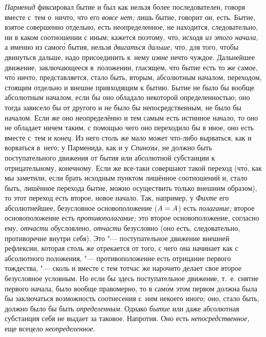 {\em Парменид} фиксировал бытие и был как нельзя более последователен, говоря
вместе с~тем о~ничто, что его {\em вовсе нет;} лишь бытие, говорит он, есть.
Бытие, взятое совершенно отдельно, есть неопределенное, не находится,
следовательно, ни в каком соотношении с иным; кажется поэтому, что, исходя
{\em из этого начала,} а именно из самог\'{о} бытия,
нельзя {\em двигаться дальше,} что, для того,
чтобы двинуться дальше, надо присоединить к~нему {\em извне} нечто чуждое.
Дальнейшее движение, заключающееся в~положении, гласящем, что бытие есть то же
самое, чт\'{о} ничто, представляется, стало быть, вторым, абсолютным началом,
переходом, стоящим отдельно и внешне привходящим к бытию. Бытие не было бы
вообще абсолютным началом, если бы оно обладало некоторой определенностью; оно
тогда зависело бы от другого и не было бы непосредственным, не было бы началом.
Если же оно неопределённо и тем самым есть истинное начало, то оно не обладает
ничем таким, с помощью чего оно переходило бы в иное, оно есть вместе с~тем и
{\em конец}. Из него столь же мало может что-либо вырваться, как и ворваться
в~него; у Парменида, как и у {\em Спинозы,} не должно быть поступательного
движения от бытия или абсолютной субстанции к отрицательному, конечному. Если
же все-таки совершают такой переход (чт\'{о}, как мы заметили, если брать
исходным пунктом лишённое соотношений и, стало быть, лишённое перехода бытие,
можно осуществить только внешним образом), то этот переход есть второе, новое
начало. Так, например, у {\em Фихте} его абсолютнейшее, безусловное
основоположение ($A\hm=A$) есть {\em полагание;} второе основоположение есть
{\em противополагание;} это второе основоположение, согласно ему, {\em отчасти}
обусловлено, {\em отчасти} безусловно (оно есть, следовательно, противоречие
внутри себя). Это "--- поступательное движение внешней рефлексии, которая столь
же отрекается от того, с чего она начинает как с абсолютного положения, "---
противоположение есть отрицание первого тождества, "--- сколь и вместе с тем
тотчас же нарочито делает свое второе безусловное условным. Но если бы здесь
поступательное движение, т.~е. снятие первого начала, было вообще правомерно,
то в сам\'{о}м этом первом должна была бы заключаться возможность соотнесения
с~ним некоего иного; оно, стало быть, должно было бы быть {\em определенным}.
Однако {\em бытие} или даже абсолютная субстанция себя не выдает за таковое.
Напротив. Оно есть {\em непосредственное,} еще всецело {\em неопределенное}.

